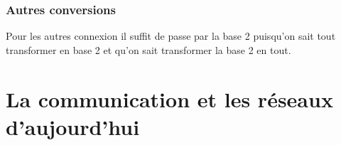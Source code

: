 \documentclass[10pt,a4paper]{article}
\begin{document}
 \subsubsection{Autres conversions}
 Pour les autres connexion il suffit de passe par la base 2 puisqu'on sait tout transformer en base 2 et qu'on sait transformer la base 2 en tout.

 \section{La communication et les réseaux d'aujourd'hui}









 
\end{document}
